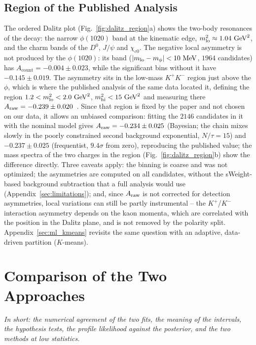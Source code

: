 \subsection{Region of the Published Analysis}
The ordered Dalitz plot (Fig.~\ref{fig:dalitz_region}a) shows the two-body resonances of the decay: the narrow $\phi(1020)$ band at the kinematic edge, $m^2_{\mathrm{lo}}\approx1.04\,\,\text{Ge\hspace{-.08em}V}^2$, and the charm bands of the $D^0$, $J/\psi$ and $\chi_{c0}$. The negative local asymmetry is not produced by the $\phi(1020)$: its band ($|m_{\mathrm{lo}}-m_\phi|<10\,\,\text{Me\hspace{-.08em}V}$, $1964$ candidates) has $A_{\mathrm{count}}=-0.004\pm0.023$, while the significant bins without it have $-0.145\pm0.019$. The asymmetry sits in the low-mass $K^+K^-$ region just above the $\phi$, which is where the published analysis of the same data located it, defining the region $1.2<m^2_{\mathrm{lo}}<2.0\,\,\text{Ge\hspace{-.08em}V}^2$, $m^2_{\mathrm{hi}}<15\,\,\text{Ge\hspace{-.08em}V}^2$ and measuring there $A_{\mathrm{raw}}=-0.239\pm0.020$~\cite{lhcb_cpv_2013}. Since that region is fixed by the paper and not chosen on our data, it allows an unbiased comparison: fitting the $2146$ candidates in it with the nominal model gives $A_{\mathrm{raw}}=-0.234\pm0.025$ (Bayesian; the chain mixes slowly in the poorly constrained second background exponential, $N/\tau=15$) and $-0.237\pm0.025$ (frequentist, $9.4\sigma$ from zero), reproducing the published value; the mass spectra of the two charges in the region (Fig.~\ref{fig:dalitz_region}b) show the difference directly. Three caveats apply: the binning is coarse and was not optimized; the asymmetries are computed on all candidates, without the sWeight-based background subtraction that a full analysis would use (Appendix~\ref{sec:limitations}); and, since $A_{\mathrm{raw}}$ is not corrected for detection asymmetries, local variations can still be partly instrumental -- the $K^+$/$K^-$ interaction asymmetry depends on the kaon momenta, which are correlated with the position in the Dalitz plane, and is not removed by the polarity split. Appendix~\ref{sec:ml_kmeans} revisits the same question with an adaptive, data-driven partition ($K$-means).

\FloatBarrier

\section{Comparison of the Two Approaches}
\label{app:ext_comp}
\emph{In short: the numerical agreement of the two fits, the meaning of the intervals, the hypothesis tests, the profile likelihood against the posterior, and the two methods at low statistics.}

